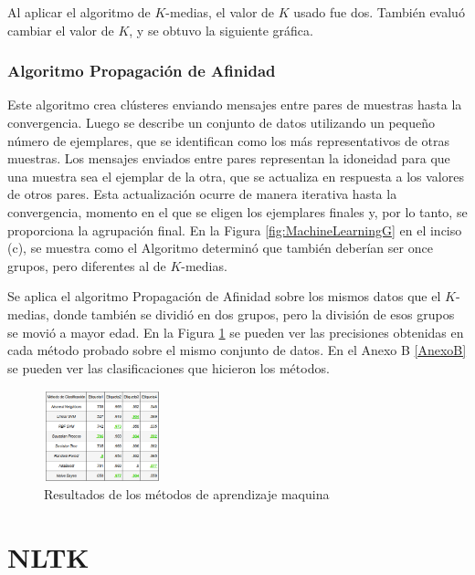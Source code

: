 \documentclass[5p,times]{elsarticle}
\begin{document}
Al aplicar el algoritmo de $K$-medias, el valor de $K$ usado fue dos. También evaluó cambiar el valor de $K$, y se obtuvo la siguiente gráfica.

\subsubsection*{Algoritmo Propagación de Afinidad}

Este algoritmo crea clústeres \cite{wang2008adaptive} enviando mensajes entre pares de muestras hasta la convergencia. Luego se describe un conjunto de datos utilizando un pequeño número de ejemplares, que se identifican como los más representativos de otras muestras. Los mensajes enviados entre pares representan la idoneidad para que una muestra sea el ejemplar de la otra, que se actualiza en respuesta a los valores de otros pares. Esta actualización ocurre de manera iterativa hasta la convergencia, momento en el que se eligen los ejemplares finales y, por lo tanto, se proporciona la agrupación final. En la Figura \ref{fig:MachineLearningG} en el inciso (c), se muestra como el Algoritmo determinó que también deberían ser once grupos, pero diferentes al de $K$-medias.


Se aplica el algoritmo Propagación de Afinidad sobre los mismos datos que el $K$-medias, donde también se dividió en dos grupos, pero la división de esos grupos se movió a mayor edad. En la Figura \ref{fig:MachineLearningR} se pueden ver las precisiones obtenidas en cada método probado sobre el mismo conjunto de datos. En el Anexo B \ref{AnexoB} se pueden ver las clasificaciones que hicieron los métodos. 


\begin{figure}[H]
\centering
\includegraphics[width=0.3\textwidth]{14}
\caption{Resultados de los métodos de aprendizaje maquina}\label{fig:MachineLearningR}
\end{figure}


\section*{NLTK}
\end{document}
